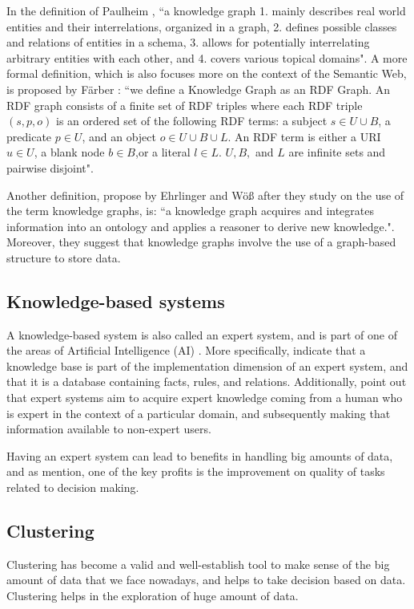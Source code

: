 \documentclass[runningheads]{llncs}
\begin{document}
In the definition of Paulheim \cite{Paulheim}, ``a knowledge graph
1. mainly describes real world entities and their interrelations, organized in a graph, 2. defines possible classes and relations of entities in a schema, 3. allows for potentially interrelating arbitrary entities with each other, and 4. covers various topical domains". A more formal definition, which is also focuses more on the context of the Semantic Web, is proposed by F{\"a}rber \cite{Farber}: ``we define a Knowledge Graph as an RDF Graph. An RDF graph consists of a finite set of RDF triples where each RDF triple $(s, p, o)$ is an ordered set of the following RDF terms: a subject $s \in U ∪ B$, a predicate $p \in U$, and an object $o \in U ∪ B ∪ L$. An RDF term is either a URI $u \in U$, a blank node $b \in B$,or a literal $l \in L$. $U, B,$ and $L$ are infinite sets and pairwise disjoint".

Another definition, propose by Ehrlinger and W{\"o}{\ss} \cite{Ehrlinger} after they study on the use of the term knowledge graphs, is: ``a knowledge graph acquires and integrates information into an ontology and applies a reasoner to derive new knowledge.". Moreover, they suggest that knowledge graphs involve the use of a graph-based structure to store data.


\subsection{Knowledge-based systems}
A knowledge-based system is also called an expert system, and is part of one of the areas of Artificial Intelligence (AI) \cite{Tripathi}. More specifically, \cite{Engelmore} indicate that a knowledge base is part of the implementation dimension of an expert system, and that it is a database containing facts, rules, and relations. Additionally, \cite{Tripathi} point out that expert systems aim to acquire expert knowledge coming from a human who is expert in the context of a particular domain, and subsequently making that information available to non-expert users.

Having an expert system can lead to benefits in handling big amounts of data, and as \cite{Engelmore} mention, one of the key profits is the improvement on quality of tasks related to decision making.


\subsection{Clustering}
Clustering has become a valid and well-establish tool to make sense of the big amount of data that we face nowadays, and helps to take decision based on data. Clustering helps in the exploration of huge amount of data. \cite{Pedrycz}
\end{document}
